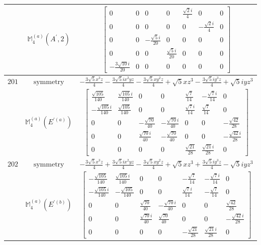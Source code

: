 \documentclass[fleqn,8pt,landscape]{jsarticle}
\begin{document}
\begin{longtable}{ccc}
$  $ & $ \mathbb{M}_{4}^{(a)}(A^{\prime},2) $ & $ \begin{bmatrix} 0 & 0 & 0 & 0 & \frac{\sqrt{2} i}{4} & 0 & 0 \\ 0 & 0 & 0 & 0 & 0 & - \frac{\sqrt{2} i}{4} & 0 \\ 0 & 0 & - \frac{\sqrt{5} i}{20} & 0 & 0 & 0 & 0 \\ 0 & 0 & 0 & \frac{\sqrt{5} i}{20} & 0 & 0 & 0 \\ - \frac{3 \sqrt{10} i}{20} & 0 & 0 & 0 & 0 & 0 & 0 \end{bmatrix} $ \\ \hline
$ 201 $ & $ \text{symmetry} $ & $ - \frac{3 \sqrt{5} x^{3} z}{4} - \frac{3 \sqrt{5} i x^{2} y z}{4} - \frac{3 \sqrt{5} x y^{2} z}{4} + \sqrt{5} x z^{3} - \frac{3 \sqrt{5} i y^{3} z}{4} + \sqrt{5} i y z^{3} $ \\
$  $ & $ \mathbb{M}_{4}^{(a)}(E^{\prime(a)}) $ & $ \begin{bmatrix} \frac{\sqrt{105}}{140} & \frac{\sqrt{105} i}{140} & 0 & 0 & \frac{\sqrt{7}}{14} & - \frac{\sqrt{7} i}{14} & 0 \\ - \frac{\sqrt{105} i}{140} & \frac{\sqrt{105}}{140} & 0 & 0 & \frac{\sqrt{7} i}{14} & \frac{\sqrt{7}}{14} & 0 \\ 0 & 0 & - \frac{\sqrt{70}}{40} & - \frac{\sqrt{70} i}{40} & 0 & 0 & - \frac{\sqrt{42}}{28} \\ 0 & 0 & \frac{\sqrt{70} i}{40} & - \frac{\sqrt{70}}{40} & 0 & 0 & - \frac{\sqrt{42} i}{28} \\ 0 & 0 & 0 & 0 & \frac{\sqrt{21}}{28} & \frac{\sqrt{21} i}{28} & 0 \end{bmatrix} $ \\ \hline
$ 202 $ & $ \text{symmetry} $ & $ - \frac{3 \sqrt{5} x^{3} z}{4} + \frac{3 \sqrt{5} i x^{2} y z}{4} - \frac{3 \sqrt{5} x y^{2} z}{4} + \sqrt{5} x z^{3} + \frac{3 \sqrt{5} i y^{3} z}{4} - \sqrt{5} i y z^{3} $ \\
$  $ & $ \mathbb{M}_{4}^{(a)}(E^{\prime(b)}) $ & $ \begin{bmatrix} - \frac{\sqrt{105}}{140} & \frac{\sqrt{105} i}{140} & 0 & 0 & - \frac{\sqrt{7}}{14} & - \frac{\sqrt{7} i}{14} & 0 \\ - \frac{\sqrt{105} i}{140} & - \frac{\sqrt{105}}{140} & 0 & 0 & \frac{\sqrt{7} i}{14} & - \frac{\sqrt{7}}{14} & 0 \\ 0 & 0 & \frac{\sqrt{70}}{40} & - \frac{\sqrt{70} i}{40} & 0 & 0 & \frac{\sqrt{42}}{28} \\ 0 & 0 & \frac{\sqrt{70} i}{40} & \frac{\sqrt{70}}{40} & 0 & 0 & - \frac{\sqrt{42} i}{28} \\ 0 & 0 & 0 & 0 & - \frac{\sqrt{21}}{28} & \frac{\sqrt{21} i}{28} & 0 \end{bmatrix} $ \\ \hline

\end{longtable}
\end{document}
